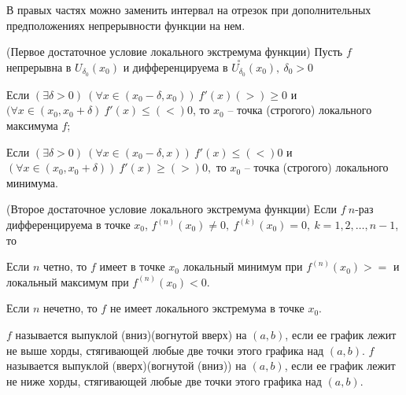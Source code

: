 \begin{multicols}{2}
    \begin{note}{}{}
         В правых частях можно заменить интервал на отрезок при дополнительных предположениях непрерывности функции на нем.
    \end{note}
    \begin{theorema}{(Первое достаточное условие локального экстремума функции)}{}
         Пусть $f$ непрерывна в $U_{\delta_0}(x_0)$ и дифференцируема в $\overset{\circ}{U_{\delta_0}}(x_0),\ \delta_0 > 0$ 
    \begin{enumerate*}
        \item Если $(\exists \delta > 0)\ (\forall x \in (x_0 - \delta, x_0)) \ f'(x) (>) \geq 0$ и\\ $(\forall x \in (x_0, x_0 + \delta)\ f'(x) \leq (<) 0$, то $x_0$ -- точка (строгого) локального максимума $f$;
        \item Если $(\exists \delta > 0)\ (\forall x \in (x_0 - \delta, x))\ f'(x) \leq (<) 0$ и\\ $(\forall x \in (x_0, x_0+\delta)) \ f'(x) \geq (>) 0,$ то $x_0$ -- точка (строгого) локального минимума.
    \end{enumerate*}
    \end{theorema}
    \begin{theorema}{(Второе достаточное условие локального экстремума функции)}{}
         Если $f\ n$-раз дифференцируема в точке $x_0$, $f^{(n)} (x_0) \neq 0, \ f^{(k)}(x_0) = 0,\ k = 1, 2, \ldots, n-1$, то \begin{enumerate*}
            \item Если $n$ четно, то $f$ имеет в точке $x_0$ локальный минимум при $f^{(n)} (x_0) > =$ и локальный максимум при $f^{(n)}(x_0) < 0.$
            \item Если $n$ нечетно, то $f$ не имеет локального экстремума в точке $x_0$.
    \end{enumerate*}
    \end{theorema}
    \begin{definition}{}{}
        $f$ называется выпуклой (вниз)(вогнутой вверх) на $(a,b)$, если ее график лежит не выше хорды, стягивающей любые две точки этого графика над $(a,b)$. $f$ называется выпуклой (вверх)(вогнутой (вниз)) на $(a,b)$, если ее график лежит не ниже хорды, стягивающей любые две точки этого графика над $(a,b)$.
    \end{definition}
    

\end{multicols}
